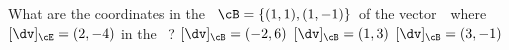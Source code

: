 \begin{activity}
What are the coordinates in the ~\(\cB=\{(1,1),(1,-1)\}\)\ of the vector~\dv\ where \([\dv]_\cE=(2,-4)\) in the ~\cE?
{\([\dv]_\cB=(-2,6)\)}
{\([\dv]_\cB=(1,3)\)}
{\([\dv]_\cB=(3,-1)\)}
\end{activity}





